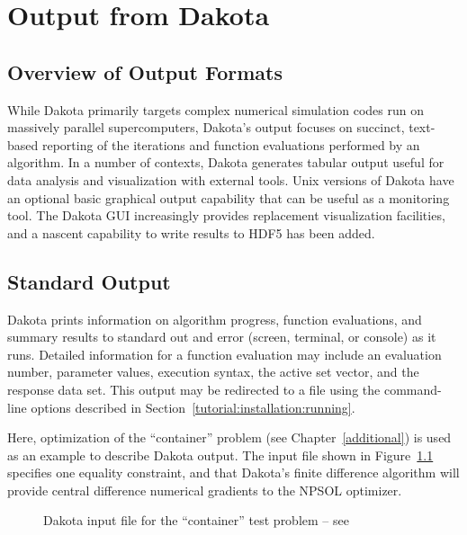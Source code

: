 \chapter{Output from Dakota}\label{output}

\section{Overview of Output Formats}\label{output:overview}

While Dakota primarily targets complex numerical simulation codes run
on massively parallel supercomputers, Dakota's output focuses on
succinct, text-based reporting of the iterations and function
evaluations performed by an algorithm. In a number of contexts, Dakota
generates tabular output useful for data analysis and visualization
with external tools.  Unix versions of Dakota have an optional basic
graphical output capability that can be useful as a monitoring tool.
The Dakota GUI increasingly provides replacement visualization
facilities, and a nascent capability to write results to HDF5 has
been added.

\section{Standard Output}\label{output:standard}

Dakota prints information on algorithm progress, function evaluations,
and summary results to standard out and error (screen, terminal, or
console) as it runs.  Detailed information for a function evaluation
may include an evaluation number, parameter values, execution syntax,
the active set vector, and the response data set.  This output may be
redirected to a file using the command-line options described in
Section~\ref{tutorial:installation:running}.

Here, optimization of the ``container'' problem (see
Chapter~\ref{additional}) is used as an example to describe Dakota
output. The input file shown in Figure~\ref{output:incont} specifies
one equality constraint, and that Dakota's finite difference algorithm
will provide central difference numerical gradients to the NPSOL
optimizer.
\begin{figure}
  \begin{small}
    \begin{bigbox}
    \end{bigbox}
  \end{small}
  \caption{Dakota input file for the ``container'' test problem --
see \protect{} }
  \label{output:incont}
\end{figure}

